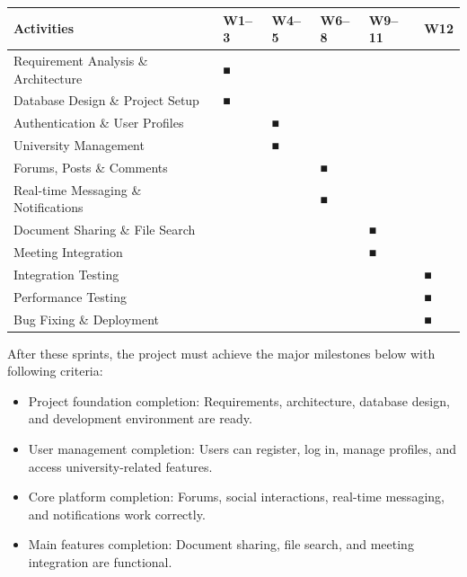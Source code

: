 \documentclass[12pt]{article}
\begin{document}
\begin{longtable}{|>{\raggedright\arraybackslash}p{}|>{\raggedright\arraybackslash}p{}|>{\raggedright\arraybackslash}p{}|>{\raggedright\arraybackslash}p{}|>{\raggedright\arraybackslash}p{}|>{\raggedright\arraybackslash}p{}|}
\hline
Activities & W1–3 & W4–5 & W6–8 & W9–11 & W12 \\ \hline
\endhead
Requirement Analysis \& Architecture & ■ &  &  &  &  \\ \hline
Database Design \& Project Setup & ■ &  &  &  &  \\ \hline
Authentication \& User Profiles &  & ■ &  &  &  \\ \hline
University Management &  & ■ &  &  &  \\ \hline
Forums, Posts \& Comments &  &  & ■ &  &  \\ \hline
Real-time Messaging \& Notifications &  &  & ■ &  &  \\ \hline
Document Sharing \& File Search &  &  &  & ■ &  \\ \hline
Meeting Integration &  &  &  & ■ &  \\ \hline
Integration Testing &  &  &  &  & ■ \\ \hline
Performance Testing &  &  &  &  & ■ \\ \hline
Bug Fixing \& Deployment &  &  &  &  & ■ \\ \hline
\end{longtable}
\endgroup
\par\medskip
After these sprints, the project must achieve the major milestones below with following criteria:
\par\medskip
\begin{itemize}
\item Project foundation completion: Requirements, architecture, database design, and development environment are ready.
\par
\item User management completion: Users can register, log in, manage profiles, and access university-related features.
\par
\item Core platform completion: Forums, social interactions, real-time messaging, and notifications work correctly.
\par
\item Main features completion: Document sharing, file search, and meeting integration are functional.
\par
\end{itemize}
\end{document}
